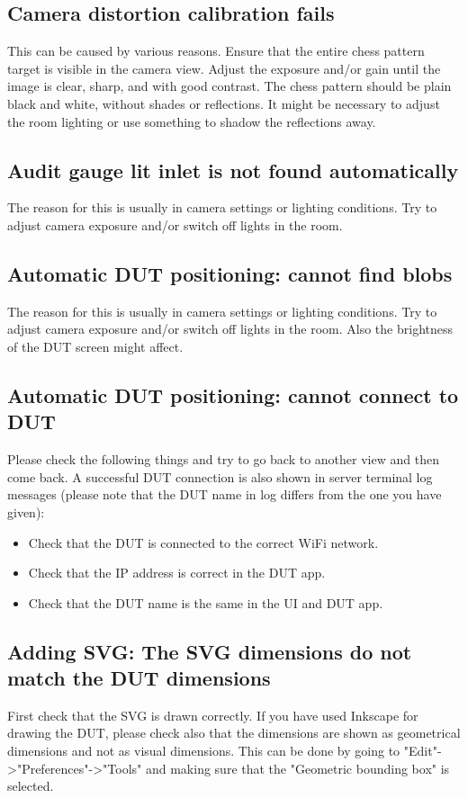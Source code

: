 \subsection{Camera distortion calibration fails}
 This can be caused by various reasons. Ensure that the entire chess pattern target is visible in the camera view. Adjust the exposure and/or gain until the image is clear, sharp, and with good contrast. The chess pattern should be plain black and white, without shades or reflections. It might be necessary to adjust the room lighting or use something to shadow the reflections away.

\subsection{Audit gauge lit inlet is not found automatically}
The reason for this is usually in camera settings or lighting conditions. Try to adjust camera exposure and/or switch off lights in the room.

\subsection{Automatic DUT positioning: cannot find blobs}
The reason for this is usually in camera settings or lighting conditions. Try to adjust camera exposure and/or switch off lights in the room. Also the brightness of the DUT screen might affect. 

\subsection{Automatic DUT positioning: cannot connect to DUT}
Please check the following things and try to go back to another view and then come back. A successful DUT connection is also shown in server terminal log messages (please note that the DUT name in log differs from the one you have given):
\begin{itemize}
	\item Check that the DUT is connected to the correct WiFi network.
	\item Check that the IP address is correct in the DUT app.
	\item Check that the DUT name is the same in the UI and DUT app.
\end{itemize}

\subsection{Adding SVG: The SVG dimensions do not match the DUT dimensions}
First check that the SVG is drawn correctly. If you have used Inkscape for drawing the DUT, please check also that the dimensions are shown as geometrical dimensions and not as visual dimensions. This can be done by going to "Edit"->"Preferences"->"Tools" and making sure that the "Geometric bounding box" is selected.
